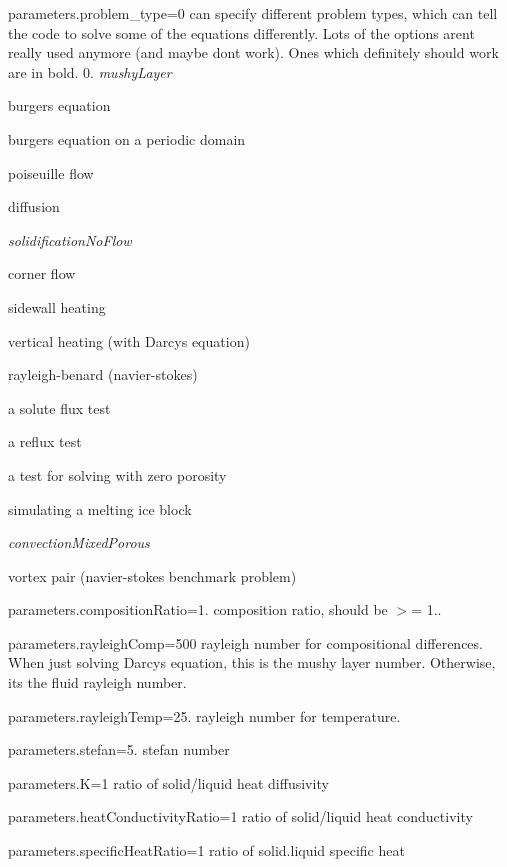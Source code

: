 {\ttfamily parameters.\+problem\+\_\+type=0} can specify different problem types, which can tell the code to solve some of the equations differently. Lots of the options aren\textquotesingle{}t really used anymore (and maybe don\textquotesingle{}t work). Ones which definitely should work are in bold. 0. {\itshape mushy\+Layer}
\begin{DoxyEnumerate}
\item burgers equation
\item burgers equation on a periodic domain
\item poiseuille flow
\item diffusion
\item {\itshape solidification\+No\+Flow}
\item corner flow
\item sidewall heating
\item vertical heating (with Darcy\textquotesingle{}s equation)
\item rayleigh-\/benard (navier-\/stokes)
\item a solute flux test
\item a reflux test
\item a test for solving with zero porosity
\item simulating a melting ice block
\item {\itshape convection\+Mixed\+Porous}
\item vortex pair (navier-\/stokes benchmark problem)
\end{DoxyEnumerate}

{\ttfamily parameters.\+composition\+Ratio=1.} composition ratio, should be $>$= 1..

{\ttfamily parameters.\+rayleigh\+Comp=500} rayleigh number for compositional differences. When just solving Darcy\textquotesingle{}s equation, this is the mushy layer number. Otherwise, it\textquotesingle{}s the fluid rayleigh number.

{\ttfamily parameters.\+rayleigh\+Temp=25.} rayleigh number for temperature.

{\ttfamily parameters.\+stefan=5.} stefan number

{\ttfamily parameters.\+K=1} ratio of solid/liquid heat diffusivity

{\ttfamily parameters.\+heat\+Conductivity\+Ratio=1} ratio of solid/liquid heat conductivity

{\ttfamily parameters.\+specific\+Heat\+Ratio=1} ratio of solid.\+liquid specific heat

